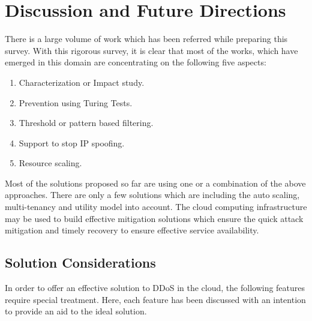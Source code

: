 \documentclass[final,5p,times,twocolumn]{elsarticle}
\begin{document}
\section{Discussion and Future Directions}
\label{discussion}
{There is a large volume of work which has been referred while preparing this survey. With this rigorous survey, it is clear that most of the works, which have emerged in this domain are concentrating on the following five aspects:
\begin{enumerate}
\item Characterization or Impact study.
\item Prevention using Turing Tests.
\item Threshold or pattern based filtering.
\item Support to stop IP spoofing.
\item Resource scaling.
\end{enumerate}}
Most of the solutions proposed so far are using one or a combination of the above approaches. There are only a few solutions which are including the auto scaling, multi-tenancy and utility model into account. {The cloud computing infrastructure may be used to build effective mitigation solutions which ensure the quick attack mitigation and timely recovery to ensure effective service availability.}

\subsection{Solution Considerations}
In order to offer an effective solution to DDoS in the cloud, the following features require special treatment. Here, each feature has been discussed with an intention to provide an aid to the ideal solution. 
\end{document}
